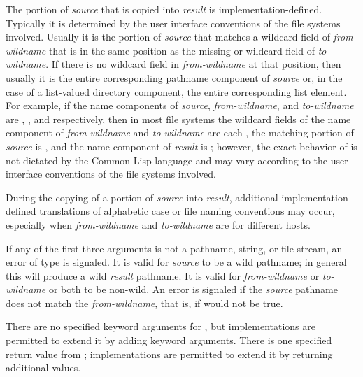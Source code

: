 \begin{newer}
\begin{defun}[Function]
    The portion of \emph{source} that is copied into \emph{result} is
    implementation-defined.  Typically it is determined by the user interface conventions
    of the file systems involved.  Usually it is the portion of \emph{source}
    that matches a wildcard field of \emph{from-wildname} that is in the same
    position as the missing or wildcard field of \emph{to-wildname}.  If there
    is no wildcard field in \emph{from-wildname} at that position, then usually
    it is the entire corresponding pathname component of \emph{source} or, in
    the case of a list-valued directory component, the entire corresponding
    list element.  For example, if the name components of \emph{source},
    \emph{from-wildname}, and \emph{to-wildname} are , , and 
    respectively, then in most file systems the wildcard fields of the
    name component of \emph{from-wildname} and \emph{to-wildname} are each , the
    matching portion of \emph{source} is , and the name component of
    \emph{result} is ; however, the exact behavior of 
    is not dictated by the Common Lisp language and may
    vary according to the user interface conventions of the file systems
    involved.

    During the copying of a portion of \emph{source} into \emph{result}, additional
    implementation-defined translations of alphabetic case or file naming
    conventions may occur, especially when \emph{from-wildname} and
    \emph{to-wildname} are for different hosts.

    If any of the first three arguments is not a pathname, string, or file
    stream, an error of type  is signaled.  It is valid for
    \emph{source} to be a wild pathname; in general this will produce a wild
    \emph{result} pathname.  It is valid for \emph{from-wildname} or \emph{to-wildname} or both
    to be non-wild.  An error is signaled if the \emph{source} pathname does not
    match the \emph{from-wildname}, that is,
    if  would not be true.
    
    There are no specified keyword arguments for , but
    implementations are permitted to extend it by adding keyword arguments.
    There is one specified return value from ;
    implementations are permitted to extend it by returning additional
    values.


\end{defun}
\end{newer}
